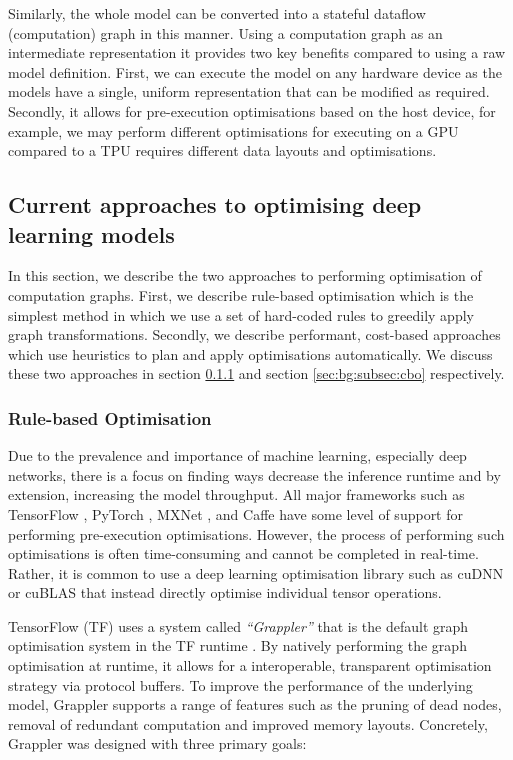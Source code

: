 Similarly, the whole model can be converted into a stateful dataflow (computation) graph in this manner. Using a computation graph as an intermediate representation it provides two key benefits compared to using a raw model definition. First, we can execute the model on any hardware device as the models have a single, uniform representation that can be modified as required. Secondly, it allows for pre-execution optimisations based on the host device, for example, we may perform different optimisations for executing on a GPU compared to a TPU requires different data layouts and optimisations.

\subsection{Current approaches to optimising deep learning models}
\label{sec:bg:subsec:currentapp}

In this section, we describe the two approaches to performing optimisation of computation graphs. First, we describe rule-based optimisation which is the simplest method in which we use a set of hard-coded rules to greedily apply graph transformations. Secondly, we describe performant, cost-based approaches which use heuristics to plan and apply optimisations automatically. We discuss these two approaches in section \ref{sec:bg:subsec:rbo} and section \ref{sec:bg:subsec:cbo} respectively.

\subsubsection{Rule-based Optimisation}
\label{sec:bg:subsec:rbo}

Due to the prevalence and importance of machine learning, especially deep networks, there is a focus on finding ways decrease the inference runtime and by extension, increasing the model throughput. All major frameworks such as TensorFlow \cite{tensorflow2015-whitepaper}, PyTorch \cite{pytorch}, MXNet \cite{chen2015mxnet}, and Caffe \cite{jia2014caffe} have some level of support for performing pre-execution optimisations. However, the process of performing such optimisations is often time-consuming and cannot be completed in real-time. Rather, it is common to use a deep learning optimisation library such as cuDNN \cite{chetlur2014cudnn} or cuBLAS \cite{cublas2008} that instead directly optimise individual tensor operations.

TensorFlow (TF) uses a system called \textit{``Grappler''} that is the default graph optimisation system in the TF runtime \cite{larsen2019tensorflow}. By natively performing the graph optimisation at runtime, it allows for a interoperable, transparent optimisation strategy via protocol buffers. To improve the performance of the underlying model, Grappler supports a range of features such as the pruning of dead nodes, removal of redundant computation and improved memory layouts. Concretely, Grappler was designed with three primary goals:

